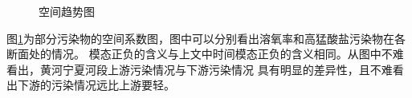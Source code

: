 \documentclass{whutmod}
\begin{document}
\begin{spacing}{1.2}
\begin{figure}[htbp]\centering                                                          %
	\caption{空间趋势图} %
	\label{空间趋势}
\end{figure}

图\ref{空间趋势}为部分污染物的空间系数图，图中可以分别看出溶氧率和高猛酸盐污染物在各断面处的情况。
模态正负的含义与上文中时间模态正负的含义相同。从图中不难看出，黄河宁夏河段上游污染情况与下游污染情况
具有明显的差异性，且不难看出下游的污染情况远比上游要轻。


\end{spacing}
\end{document}
